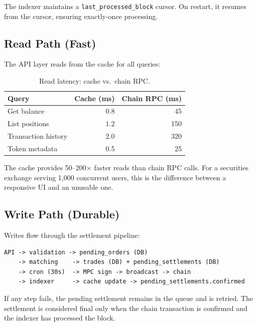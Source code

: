 The indexer maintains a \texttt{last\_processed\_block} cursor.  On
restart, it resumes from the cursor, ensuring exactly-once processing.

\subsection{Read Path (Fast)}

The API layer reads from the cache for all queries:

\begin{table}[h]
\centering
\begin{tabular}{lrr}
\toprule
\textbf{Query} & \textbf{Cache (ms)} & \textbf{Chain RPC (ms)} \\
\midrule
Get balance & 0.8 & 45 \\
List positions & 1.2 & 150 \\
Transaction history & 2.0 & 320 \\
Token metadata & 0.5 & 25 \\
\bottomrule
\end{tabular}
\caption{Read latency: cache vs.\ chain RPC.}
\label{tab:read-latency}
\end{table}

The cache provides 50--200$\times$ faster reads than chain RPC calls.
For a securities exchange serving 1,000 concurrent users, this is the
difference between a responsive UI and an unusable one.

\subsection{Write Path (Durable)}

Writes flow through the settlement pipeline:

\begin{verbatim}
API -> validation -> pending_orders (DB)
    -> matching    -> trades (DB) + pending_settlements (DB)
    -> cron (30s)  -> MPC sign -> broadcast -> chain
    -> indexer     -> cache update -> pending_settlements.confirmed
\end{verbatim}

If any step fails, the pending settlement remains in the queue and is
retried.  The settlement is considered final only when the chain
transaction is confirmed and the indexer has processed the block.

